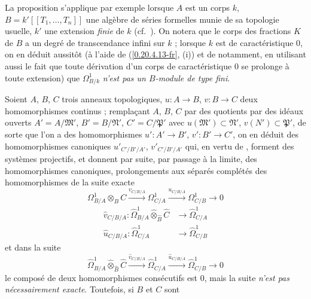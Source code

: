 \begin{env}[20.7.16]
\label{0.20.7.16-fr}
La proposition  s'applique par exemple lorsque $A$ est un
corps $k$, $B=k'[[T_1,\ldots,T_n]]$ une algèbre de séries formelles munie de
sa topologie usuelle, $k'$ une extension \emph{finie} de $k$ (cf.\
). On notera que le corps des fractions $K$ de $B$ a un
degré de transcendance infini sur $k$ ; lorsque $k$ est de caractéristique
$0$, on en déduit aussitôt (à l'aide de (\ref{0.20.4.13-fr}, (i)) et de
\sref{0.20.5.9-fr} notamment, en utilisant aussi le fait que toute dérivation
d'un corps de caractéristique $0$ se prolonge à toute extension) que
$\Omega^1_{B/k}$ \emph{n'est pas un $B$-module de type fini}.
\end{env}

\begin{env}[20.7.17]
\label{0.20.7.17-fr}
Soient $A$, $B$, $C$ trois anneaux topologiques, $u:A\to B$, $v:B\to C$ deux
homomorphismes continus ; remplaçant $A$, $B$, $C$ par des quotients par des
idéaux ouverts $A'=A/\mathfrak{M}'$, $B'=B/\mathfrak{N}'$,
$C'=C/\mathfrak{P}'$ avec $u(\mathfrak{M}')\subset\mathfrak{N}'$,
$v(N')\subset\mathfrak{P}'$, de sorte que l'on a des
homomorphismes $u':A'\to B'$, $v':B'\to C'$, on en déduit des homomorphismes
canoniques $u'_{C'/B'/A'}$, $v'_{C'/B'/A'}$ qui, en vertu de
, forment des systèmes projectifs, et donnent par suite,
par passage à la limite, des homomorphismes canoniques, prolongements aux
séparés complétés des homomorphismes de la suite exacte
\[
  \Omega^1_{B/A}\otimes_B C\xrightarrow{v_{C/B/A}}\Omega^1_{C/A}
  \xrightarrow{u_{C/B/A}}\Omega^1_{C/B}\to0
\]
\begin{align}
  \widehat v_{C/B/A}:\widehat{\Omega}^1_{B/A}
  \widehat\otimes_{\widehat B}\widehat C&\to\widehat{\Omega}^1_{C/A}
  \tag{20.7.17.1}\label{0.20.7.17.1-fr}\\
  \widehat u_{C/B/A}:\widehat{\Omega}^1_{C/A}&\to
  \widehat{\Omega}^1_{C/B} \tag{20.7.17.2}\label{0.20.7.17.2-fr}
\end{align}
et dans la suite
\begin{equation}
\tag{20.7.17.3}
\label{0.20.7.17.3-fr}
  \widehat{\Omega}^1_{B/A}\widehat\otimes_{\widehat B}\widehat C
  \xrightarrow{\widehat v_{C/B/A}}\widehat{\Omega}^1_{C/A}
  \xrightarrow{\widehat u_{C/B/A}}\widehat{\Omega}^1_{C/B}\to0
\end{equation}
le composé de deux homomorphismes consécutifs est $0$, mais la suite
\emph{n'est pas nécessairement exacte}. Toutefois, si $B$ et $C$ sont

\end{env}
